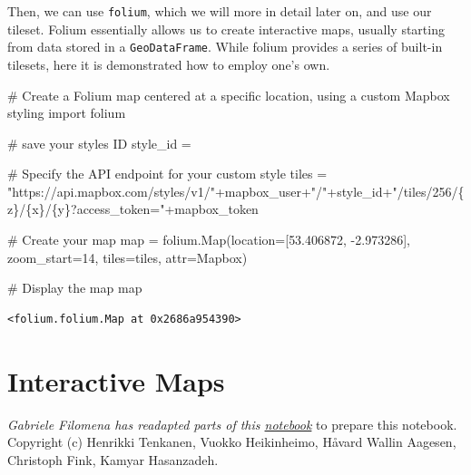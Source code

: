 \documentclass[
  letterpaper,
  DIV=11,
  numbers=noendperiod]{scrreprt}
\newenvironment{Shaded}{\begin{snugshade}}{\end{snugshade}}
\newcommand{\BuiltInTok}[1]{\textcolor[rgb]{0.00,0.23,0.31}{#1}}
\newcommand{\CommentTok}[1]{\textcolor[rgb]{0.37,0.37,0.37}{#1}}
\newcommand{\DecValTok}[1]{\textcolor[rgb]{0.68,0.00,0.00}{#1}}
\newcommand{\FloatTok}[1]{\textcolor[rgb]{0.68,0.00,0.00}{#1}}
\newcommand{\ImportTok}[1]{\textcolor[rgb]{0.00,0.46,0.62}{#1}}
\newcommand{\NormalTok}[1]{\textcolor[rgb]{0.00,0.23,0.31}{#1}}
\newcommand{\OperatorTok}[1]{\textcolor[rgb]{0.37,0.37,0.37}{#1}}
\newcommand{\SpecialCharTok}[1]{\textcolor[rgb]{0.37,0.37,0.37}{#1}}
\newcommand{\StringTok}[1]{\textcolor[rgb]{0.13,0.47,0.30}{#1}}
\begin{document}
Then, we can use \texttt{folium}, which we will more in detail later on,
and use our tileset. Folium essentially allows us to create interactive
maps, usually starting from data stored in a \texttt{GeoDataFrame}.
While folium provides a series of built-in tilesets, here it is
demonstrated how to employ one's own.

\begin{Shaded}
\begin{Highlighting}[]
\CommentTok{\# Create a Folium map centered at a specific location, using a custom Mapbox styling}
\ImportTok{import}\NormalTok{ folium}

\CommentTok{\# save your style\textquotesingle{}s ID}
\NormalTok{style\_id }\OperatorTok{=} \StringTok{\textquotesingle{}\textquotesingle{}} 

\CommentTok{\# Specify the API endpoint for your custom style}
\NormalTok{tiles }\OperatorTok{=} \StringTok{"https://api.mapbox.com/styles/v1/"}\OperatorTok{+}\NormalTok{mapbox\_user}\OperatorTok{+}\StringTok{"/"}\OperatorTok{+}\NormalTok{style\_id}\OperatorTok{+}\StringTok{"/tiles/256/}\SpecialCharTok{\{z\}}\StringTok{/}\SpecialCharTok{\{x\}}\StringTok{/}\SpecialCharTok{\{y\}}\StringTok{?access\_token="}\OperatorTok{+}\NormalTok{mapbox\_token}

\CommentTok{\# Create your map}
\BuiltInTok{map} \OperatorTok{=}\NormalTok{ folium.Map(location}\OperatorTok{=}\NormalTok{[}\FloatTok{53.406872}\NormalTok{, }\OperatorTok{{-}}\FloatTok{2.973286}\NormalTok{], zoom\_start}\OperatorTok{=}\DecValTok{14}\NormalTok{,}
\NormalTok{               tiles}\OperatorTok{=}\NormalTok{tiles,}
\NormalTok{               attr}\OperatorTok{=}\StringTok{\textquotesingle{}Mapbox\textquotesingle{}}\NormalTok{)}

\CommentTok{\# Display the map}
\BuiltInTok{map}
\end{Highlighting}
\end{Shaded}

\begin{verbatim}
<folium.folium.Map at 0x2686a954390>
\end{verbatim}


\chapter{Interactive Maps}\label{interactive-maps}

\emph{Gabriele Filomena has readapted parts of this
\href{https://autogis-site.readthedocs.io/en/latest/lessons/lesson-5/interactive-maps.html}{notebook}}
to prepare this notebook. Copyright (c) Henrikki Tenkanen, Vuokko
Heikinheimo, Håvard Wallin Aagesen, Christoph Fink, Kamyar Hasanzadeh.
\end{document}
